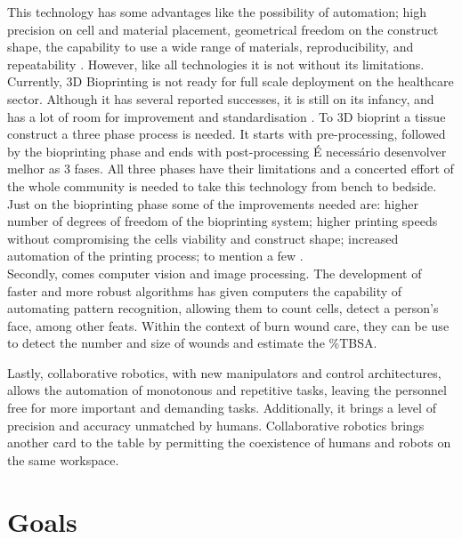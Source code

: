 This technology has some advantages like the possibility of automation; high precision on cell and material placement, geometrical freedom on the construct shape, the capability to use a wide range of materials, reproducibility, and repeatability \cite{Vijayavenkataraman2018_bioprinting_tissues_organs_regen_med}. However, like all technologies it is not without its limitations. Currently, 3D Bioprinting is not ready for full scale deployment on the healthcare sector. Although it has several reported successes, it is still on its infancy, and has a lot of room for improvement and standardisation \cite{Vijayavenkataraman2018_bioprinting_tissues_organs_regen_med, Datta2018_essential_steps_bioprinting}. To 3D bioprint a tissue construct a three phase process is needed. It starts with pre-processing, followed by the bioprinting phase and ends with post-processing \cite{Datta2018_essential_steps_bioprinting} {\color{red} É necessário desenvolver melhor as 3 fases}. All three phases have their limitations and a concerted effort of the whole community is needed to take this technology from bench to bedside. Just on the bioprinting phase some of the improvements needed are: higher number of degrees of freedom of the bioprinting system; higher printing speeds without compromising the cells viability and construct shape; increased automation of the printing process; to mention a few \cite{Datta2018_essential_steps_bioprinting}.\\

Secondly, comes computer vision and image processing. The development of faster and more robust algorithms has given computers the capability of automating pattern recognition, allowing them to count cells, detect a person's face, among other feats. Within the context of burn wound care, they can be use to detect the number and size of wounds and estimate the \%TBSA. 

Lastly, collaborative robotics, with new manipulators and control architectures, allows the automation of monotonous and repetitive tasks, leaving the personnel free for more important and demanding tasks. Additionally, it brings a level of precision and accuracy unmatched by humans. Collaborative robotics brings another card to the table by permitting the coexistence of humans and robots on the same workspace.


\section{Goals} %
\label{sec:goals}


